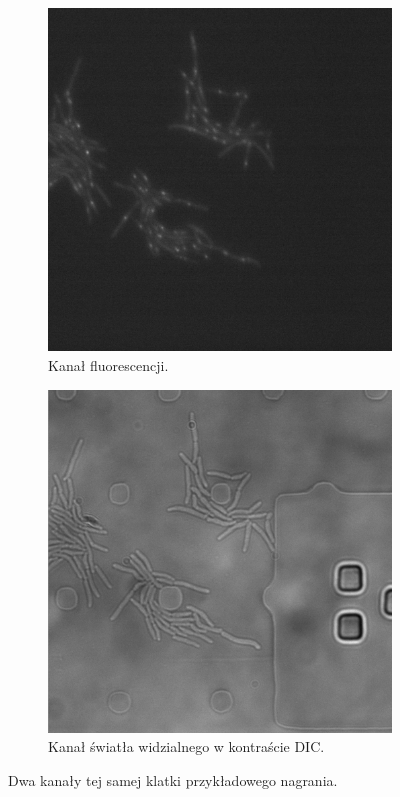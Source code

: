 \documentclass[declaration,shortabstract,mgr]{iithesis}
\begin{document}
\begin{figure}[h]
  \centering
  
  \begin{subfigure}[t]{.45\textwidth}
    \centering
    \includegraphics[width=\textwidth]{images/input-channel-1.png}
    \caption{\centering Kanał fluorescencji.}
  \end{subfigure}
  \hfill
  \begin{subfigure}[t]{.45\textwidth}
    \centering
    \includegraphics[width=\textwidth]{images/input-channel-2.png}
    \caption{\centering Kanał światła widzialnego w kontraście DIC.}
  \end{subfigure}
  \hfill
    
  \caption{Dwa kanały tej samej klatki przykładowego nagrania.}
  \label{fig:input-images}
\end{figure}
\end{document}
